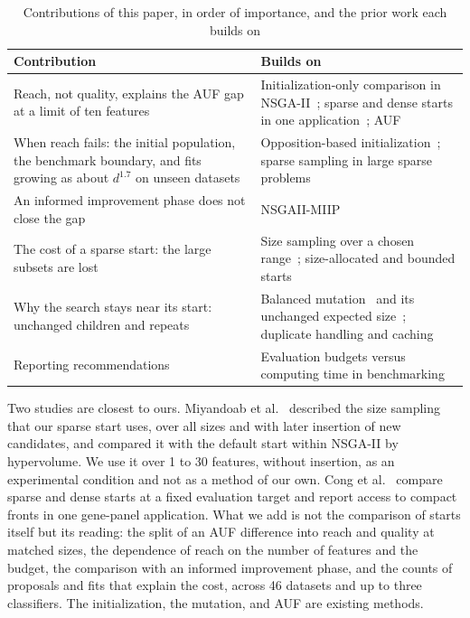 \begin{table}[!tbp]
\caption{Contributions of this paper, in order of importance, and the prior work each builds on}
\label{tab:positioning}
\centering
\small
\setlength{\tabcolsep}{4pt}
\begin{tabular}{@{}>{\raggedright\arraybackslash}p{58mm}>{\raggedright\arraybackslash}p{62mm}@{}}
\toprule
Contribution & Builds on \\
\midrule
Reach, not quality, explains the AUF gap at a limit of ten features
  & Initialization-only comparison in NSGA-II~\cite{Miyandoab2024}; sparse and dense starts in one application~\cite{Cong2026}; AUF~\cite{Koprivec2020} \\
\addlinespace
When reach fails: the initial population, the benchmark boundary, and fits growing as about $d^{1.7}$ on unseen datasets
  & Opposition-based initialization~\cite{Tizhoosh2005OBL,Li2025}; sparse sampling in large sparse problems~\cite{Kropp2022} \\
\addlinespace
An informed improvement phase does not close the gap
  & NSGAII-MIIP~\cite{Li2025} \\
\addlinespace
The cost of a sparse start: the large subsets are lost
  & Size sampling over a chosen range~\cite{Miyandoab2024}; size-allocated and bounded starts~\cite{Deniz2019,Cattelani2022} \\
\addlinespace
Why the search stays near its start: unchanged children and repeats
  & Balanced mutation~\cite{Oh2004} and its unchanged expected size~\cite{Li2025}; duplicate handling and caching~\cite{Jiao2024PRDH,Wang2023Dup,Li2020GADMS} \\
\addlinespace
Reporting recommendations
  & Evaluation budgets versus computing time in benchmarking~\cite{BartzBeielstein2020} \\
\bottomrule
\end{tabular}
\end{table}

Two studies are closest to ours. Miyandoab et al.~\cite{Miyandoab2024} described the size sampling that our sparse start uses, over all sizes and with later insertion of new candidates, and compared it with the default start within NSGA-II by hypervolume. We use it over 1 to 30 features, without insertion, as an experimental condition and not as a method of our own. Cong et al.~\cite{Cong2026} compare sparse and dense starts at a fixed evaluation target and report access to compact fronts in one gene-panel application. What we add is not the comparison of starts itself but its reading: the split of an AUF difference into reach and quality at matched sizes, the dependence of reach on the number of features and the budget, the comparison with an informed improvement phase, and the counts of proposals and fits that explain the cost, across 46 datasets and up to three classifiers. The initialization, the mutation, and AUF are existing methods.

